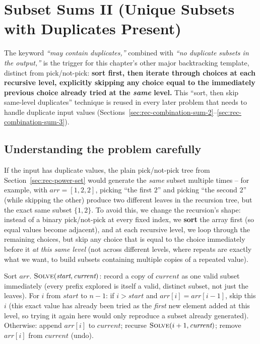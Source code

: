 \section{Subset Sums II (Unique Subsets with Duplicates Present)}
\label{sec:rec-subset-sum-2}


\begin{patternbox}
The keyword \emph{``may contain duplicates,''} combined with
\emph{``no duplicate subsets in the output,''} is the trigger for this
chapter's other major backtracking template, distinct from pick/not-pick:
\textbf{sort first, then iterate through choices at each recursive level,
explicitly skipping any choice equal to the immediately previous choice
already tried at the \emph{same} level.} This ``sort, then skip
same-level duplicates'' technique is reused in every later problem that
needs to handle duplicate input values
(Sections~\ref{sec:rec-combination-sum-2}--\ref{sec:rec-combination-sum-3}).
\end{patternbox}

\subsection*{Understanding the problem carefully}

If the input has duplicate values, the plain pick/not-pick tree from
Section~\ref{sec:rec-power-set} would generate the \emph{same} subset
multiple times -- for example, with $\textit{arr}=[1,2,2]$, picking
``the first $2$'' and picking ``the second $2$'' (while skipping the
other) produce two different leaves in the recursion tree, but the
exact same subset $\{1,2\}$. To avoid this, we change the recursion's
shape: instead of a binary pick/not-pick at every fixed index, we
\textbf{sort} the array first (so equal values become adjacent), and at
each recursive level, we loop through the remaining choices, but skip
any choice that is equal to the choice immediately before it \emph{at
this same level} (not across different levels, where repeats are
exactly what we want, to build subsets containing multiple copies of a
repeated value).

\begin{ideabox}
Sort $\textit{arr}$. $\textsc{Solve}(\textit{start}, \textit{current})$:
record a copy of $\textit{current}$ as one valid subset immediately
(every prefix explored is itself a valid, distinct subset, not just the
leaves). For $i$ from $\textit{start}$ to $n-1$: if $i > \textit{start}$
and $\textit{arr}[i] = \textit{arr}[i-1]$, skip this $i$ (this exact
value has already been tried as the \emph{first} new element added at
this level, so trying it again here would only reproduce a subset
already generated). Otherwise: append $\textit{arr}[i]$ to
$\textit{current}$; recurse $\textsc{Solve}(i+1, \textit{current})$;
remove $\textit{arr}[i]$ from $\textit{current}$ (undo).
\end{ideabox}


